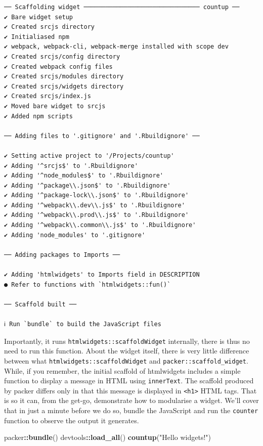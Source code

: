 \documentclass[10pt,]{krantz}
\makeatletter
\newenvironment{Shaded}{\begin{snugshade}}{\end{snugshade}}
\newcommand{\KeywordTok}[1]{\textcolor[rgb]{0.27,0.27,0.27}{\textbf{#1}}}
\newcommand{\NormalTok}[1]{#1}
\newcommand{\OperatorTok}[1]{\textcolor[rgb]{0.43,0.43,0.43}{\textbf{#1}}}
\newcommand{\StringTok}[1]{\textcolor[rgb]{0.5,0.5,0.5}{#1}}
\newenvironment{kframe}{%
\medskip{}
\setlength{\fboxsep}{.8em}
 \def\at@end@of@kframe{}%
 \ifinner\ifhmode%
  \def\at@end@of@kframe{\end{minipage}}%
  \begin{minipage}{\columnwidth}%
 \fi\fi%
 \def\FrameCommand##1{\hskip\@totalleftmargin \hskip-\fboxsep
 \colorbox{shadecolor}{##1}\hskip-\fboxsep
     \hskip-\linewidth \hskip-\@totalleftmargin \hskip\columnwidth}%
 \MakeFramed {\advance\hsize-\width
   \@totalleftmargin\z@ \linewidth\hsize
   \@setminipage}}%
 {\par\unskip\endMakeFramed%
 \at@end@of@kframe}
\renewenvironment{Shaded}{\begin{kframe}}{\end{kframe}}
\makeatother
\begin{document}
\begin{verbatim}
── Scaffolding widget ──────────────────────────────── countup ── 
✔ Bare widget setup
✔ Created srcjs directory
✔ Initialiased npm
✔ webpack, webpack-cli, webpack-merge installed with scope dev
✔ Created srcjs/config directory
✔ Created webpack config files
✔ Created srcjs/modules directory
✔ Created srcjs/widgets directory
✔ Created srcjs/index.js
✔ Moved bare widget to srcjs
✔ Added npm scripts

── Adding files to '.gitignore' and '.Rbuildignore' ──

✔ Setting active project to '/Projects/countup'
✔ Adding '^srcjs$' to '.Rbuildignore'
✔ Adding '^node_modules$' to '.Rbuildignore'
✔ Adding '^package\\.json$' to '.Rbuildignore'
✔ Adding '^package-lock\\.json$' to '.Rbuildignore'
✔ Adding '^webpack\\.dev\\.js$' to '.Rbuildignore'
✔ Adding '^webpack\\.prod\\.js$' to '.Rbuildignore'
✔ Adding '^webpack\\.common\\.js$' to '.Rbuildignore'
✔ Adding 'node_modules' to '.gitignore'

── Adding packages to Imports ──

✔ Adding 'htmlwidgets' to Imports field in DESCRIPTION
● Refer to functions with `htmlwidgets::fun()`

── Scaffold built ──

ℹ Run `bundle` to build the JavaScript files
\end{verbatim}

Importantly, it runs \texttt{htmlwidgets::scaffoldWidget} internally, there is thus no need to run this function. About the widget itself, there is very little difference between what \texttt{htmlwidgets::scaffoldWidget} and \texttt{packer::scaffold\_widget}. While, if you remember, the initial scaffold of htmlwidgets includes a simple function to display a message in HTML using \texttt{innerText}. The scaffold produced by packer differs only in that this message is displayed in \texttt{\textless{}h1\textgreater{}} HTML tags. That is so it can, from the get-go, demonstrate how to modularise a widget. We'll cover that in just a minute before we do so, bundle the JavaScript and run the \texttt{counter} function to observe the output it generates.

\begin{Shaded}
\begin{Highlighting}[]
\NormalTok{packer}\OperatorTok{::}\KeywordTok{bundle}\NormalTok{()}
\NormalTok{devtools}\OperatorTok{::}\KeywordTok{load_all}\NormalTok{()}
\KeywordTok{countup}\NormalTok{(}\StringTok{"Hello widgets!"}\NormalTok{)}
\end{Highlighting}
\end{Shaded}
\end{document}
